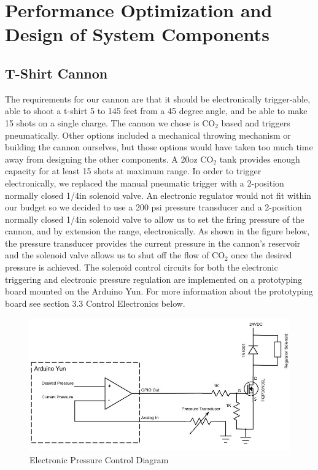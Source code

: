 \documentclass[letterpaper,12pt]{article}
\begin{document}
\section{Performance Optimization and Design of System Components}
\label{sec:optimization}

\subsection{T-Shirt Cannon}
The requirements for our cannon are that it should be electronically
trigger-able, able to shoot a t-shirt 5 to 145 feet from a 45 degree angle, and
be able to make 15 shots on a single charge. The cannon we chose is CO$_2$
based and triggers pneumatically. Other options included a mechanical throwing
mechanism or building the cannon ourselves, but those options would have taken
too much time away from designing the other components. A 20oz CO$_2$ tank
provides enough capacity for at least 15 shots at maximum range. In order to
trigger electronically, we replaced the manual pneumatic trigger with
a 2-position normally closed 1/4in solenoid valve. An electronic regulator
would not fit within our budget so we decided to use a 200 psi pressure
transducer and a 2-position normally closed 1/4in solenoid valve to allow us to
set the firing pressure of the cannon, and by extension the range,
electronically. As shown in the figure below, the pressure transducer provides
the current pressure in the cannon's reservoir and the solenoid valve allows us
to shut off the flow of CO$_2$ once the desired pressure is achieved. The
solenoid control circuits for both the electronic triggering and electronic
pressure regulation are implemented on a prototyping board mounted on the
Arduino Yun. For more information about the prototyping board see section 3.3
Control Electronics below.\\

\begin{figure}[h!]
  \centering
  \includegraphics[width=15cm]{./pics/cannon/PressureControl.jpg}
  \caption{Electronic Pressure Control Diagram}
  \label{fig:pressure_diagram}
\end{figure}
\end{document}
